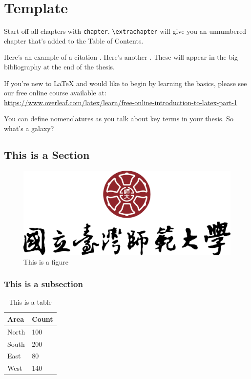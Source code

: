 \documentclass[12pt]{caltech_thesis}
\begin{document}
\chapter{Template}
Start off all chapters with \verb|chapter|.  \verb|\extrachapter| will give you an unnumbered chapter that's added to the Table of Contents. 

Here's an example of a citation \citep{GMP81}. Here's another \citep{PP98}. These will appear in the big bibliography at the end of the thesis.

If you're new to \LaTeX{} and would like to begin by learning the basics, please see our free online course available at:\\ \url{https://www.overleaf.com/latex/learn/free-online-introduction-to-latex-part-1} 

You can define nomenclatures  as you talk about key terms in your thesis. So what's a galaxy? 


\section{This is a Section}

\begin{figure}[hbt!]
\centering
\includegraphics[width=.3\textwidth]{NTNU.png}
\caption{This is a figure}\label{fig:logo}
\end{figure}

\subsection{This is a subsection}

\begin{table}[hbt!]
\centering
\begin{tabular}{ll}
\hline
Area & Count\\
\hline
North & 100\\
South & 200\\
East & 80\\
West & 140\\
\hline
\end{tabular}
\caption{This is a table}\label{tab:sample}
\end{table}
\end{document}
